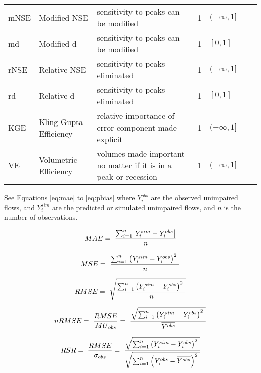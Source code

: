 \begin{longtable}[h]{p{1.25cm}p{4.45cm}p{5cm}Rp{1.55cm}Rp{2.25cm}}
	\midrule
	mNSE & Modified NSE & sensitivity to peaks can be modified & 1 & $(-\infty , 1]$ \\
	md & Modified d & sensitivity to peaks can be modified & 1 & $[0 , 1]$ \\
	rNSE & Relative NSE & sensitivity to peaks eliminated & 1 & $(-\infty , 1]$ \\
	rd & Relative d & sensitivity to peaks eliminated & 1 & $[0 , 1]$ \\
	\midrule
	KGE & Kling-Gupta Efficiency & relative importance of error component made explicit & 1 & $(-\infty , 1]$ \\
	VE & Volumetric Efficiency & volumes made important no matter if it is in a peak or recession & 1 & $(-\infty , 1]$ \\
	\bottomrule
	\end{longtable}
	\label{table:mof}
\endgroup

See Equations \ref{eq:mae} to \ref{eq:pbias} where $Y^{obs}_i$ are the observed unimpaired flows, and $Y^{sim}_i$ are the predicted or simulated unimpaired flows, and $n$ is the number of observations.

\begin{equation} 
	\label{eq:mae}
	MAE =\ \frac{\sum^n_{i=1}\abs{Y^{sim}_i - Y^{obs}_i}}{n} \\
\end{equation}

\begin{equation} 
	\label{eq:mse}
	MSE =\ \frac{\sum^n_{i=1}{{\left(Y^{sim}_i-Y^{obs}_i\right)}^2\ }}{n} \\
\end{equation}

\begin{equation} 
	\label{eq:rmse}
	RMSE =\ \sqrt{\frac{\sum^n_{i=1}{{\left(Y^{sim}_i-Y^{obs}_i\right)}^2\ }}{n}} \\
\end{equation}

\begin{equation} 
	\label{eq:nrmse}
	nRMSE =\ \frac{RMSE}{{MU}_{obs}}=\ \frac{\sqrt{\sum^n_{i=1}{{\left(Y^{sim}_i-Y^{obs}_i\right)}^2\ }}}{\overline{Y^{obs}}} \\
\end{equation}

\begin{equation} 
	\label{eq:rsr}
	RSR =\ \frac{RMSE}{\sigma_{obs}}=\ \cfrac{\sqrt{\sum^n_{i=1}{{\left(Y^{sim}_i-Y^{obs}_i\right)}^2\ }}}{\sqrt{\sum^n_{i=1}{{\left(Y^{obs}_i-\overline{Y^{obs}}\right)}^2\ }}} \\
\end{equation}

